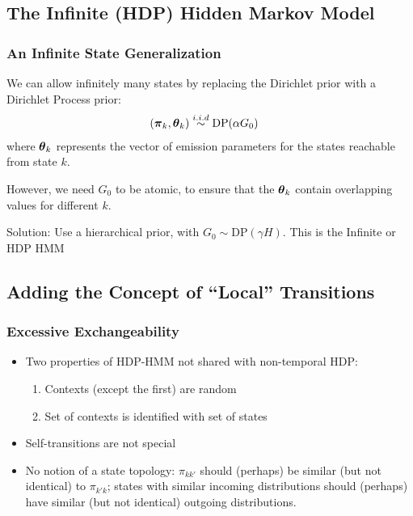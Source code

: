 \documentclass[11pt, serif, mathserif, table,trans]{beamer}
\begin{document}
\subsection{The Infinite (HDP) Hidden Markov Model}
\begin{frame}
  \frametitle{An Infinite State Generalization}
  We can allow infinitely many states by replacing the Dirichlet prior
  with a Dirichlet Process prior:
  \begin{align}
    \label{eq:5}
    (\boldsymbol{\pi}_k, \boldsymbol{\theta}_k) &\stackrel{i.i.d}{\sim} \mathrm{DP}(\alpha G_0)
  \end{align}
  where $\boldsymbol{\theta}_k$ represents the vector of emission parameters for the states
  reachable from state $k$.
  \pause

  \vspace{0.2in}

  However, we need $G_0$ to be atomic, to ensure that the $\boldsymbol{\theta}_k$
  contain overlapping values for different $k$.
  \pause

  \vspace{0.2in}
  Solution: Use a hierarchical prior, with $G_0 \sim
    \mathrm{DP}(\gamma H)$.  This is the Infinite or HDP HMM
    \cite{beal2001infinite,teh2006hierarchical}
\end{frame}

\subsection{Adding the Concept of ``Local'' Transitions}
\begin{frame}
  \frametitle{Excessive Exchangeability}
  \begin{itemize}[<+->]
  \item Two properties of HDP-HMM not shared with non-temporal HDP:
    \begin{enumerate}
    \item Contexts (except the first) are random
    \item Set of contexts is identified with set of states
    \end{enumerate}
  \item Self-transitions are not special
  \item No notion of a state topology: $\pi_{kk'}$ should (perhaps) be
    similar (but not identical) to $\pi_{k'k}$; states with similar incoming distributions should (perhaps)
    have similar (but not identical) outgoing distributions.
  \end{itemize}
\end{frame}
\end{document}
